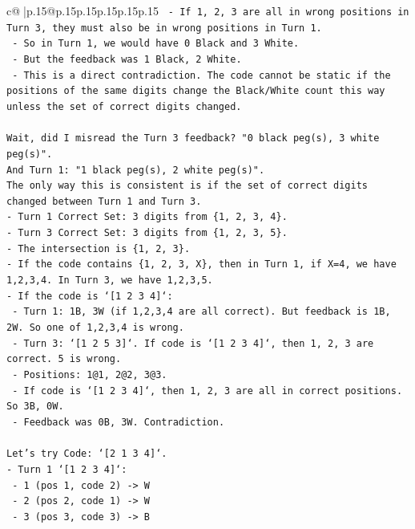 \documentclass{article}
\begin{document}
{\begin{supertabular}{c@{$\;$}|p{.15\linewidth}@{}p{.15\linewidth}p{.15\linewidth}p{.15\linewidth}p{.15\linewidth}p{.15\linewidth}}
{{{\texttt{    {-} If 1, 2, 3 are all in wrong positions in Turn 3, they must also be in wrong positions in Turn 1.} \\
\texttt{    {-} So in Turn 1, we would have 0 Black and 3 White.} \\
\texttt{    {-} But the feedback was 1 Black, 2 White.} \\
\texttt{    {-} This is a direct contradiction. The code cannot be static if the positions of the same digits change the Black/White count this way unless the set of correct digits changed.} \\
\\ 
\texttt{Wait, did I misread the Turn 3 feedback? "0 black peg(s), 3 white peg(s)".} \\
\texttt{And Turn 1: "1 black peg(s), 2 white peg(s)".} \\
\texttt{The only way this is consistent is if the set of correct digits changed between Turn 1 and Turn 3.} \\
\texttt{{-} Turn 1 Correct Set: 3 digits from \{1, 2, 3, 4\}.} \\
\texttt{{-} Turn 3 Correct Set: 3 digits from \{1, 2, 3, 5\}.} \\
\texttt{{-} The intersection is \{1, 2, 3\}.} \\
\texttt{{-} If the code contains \{1, 2, 3, X\}, then in Turn 1, if X=4, we have 1,2,3,4. In Turn 3, we have 1,2,3,5.} \\
\texttt{{-} If the code is `{[}1 2 3 4{]}`:} \\
\texttt{  {-} Turn 1: 1B, 3W (if 1,2,3,4 are all correct). But feedback is 1B, 2W. So one of 1,2,3,4 is wrong.} \\
\texttt{  {-} Turn 3: `{[}1 2 5 3{]}`. If code is `{[}1 2 3 4{]}`, then 1, 2, 3 are correct. 5 is wrong.} \\
\texttt{    {-} Positions: 1@1, 2@2, 3@3.} \\
\texttt{    {-} If code is `{[}1 2 3 4{]}`, then 1, 2, 3 are all in correct positions. So 3B, 0W.} \\
\texttt{    {-} Feedback was 0B, 3W. Contradiction.} \\
\\ 
\texttt{Let's try Code: `{[}2 1 3 4{]}`.} \\
\texttt{{-} Turn 1 `{[}1 2 3 4{]}`:} \\
\texttt{  {-} 1 (pos 1, code 2) {-}> W} \\
\texttt{  {-} 2 (pos 2, code 1) {-}> W} \\
\texttt{  {-} 3 (pos 3, code 3) {-}> B} \\
}}}
\end{supertabular}}
\end{document}
